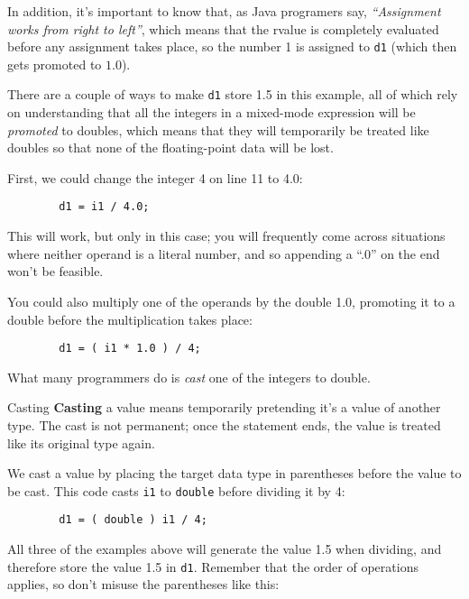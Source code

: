 In addition, it's important to know that, as Java programers say, \textit{``Assignment works from right to left''}, which means that the rvalue is completely evaluated before any assignment takes place, so the number 1 is assigned to \lstinline{d1} (which then gets promoted to $1.0$).

There are a couple of ways to make \texttt{d1} store 1.5 in this example, all of which rely on understanding that all the integers in a mixed-mode expression will be \textit{promoted} to doubles, which means that they will temporarily be treated like doubles so that none of the floating-point data will be lost.

First, we could change the integer 4 on line 11 to 4.0:

\begin{verbatim}
        d1 = i1 / 4.0;
\end{verbatim}

This will work, but only in this case; you will frequently come across situations where neither operand is a literal number, and so appending a ``.0'' on the end won't be feasible.

You could also multiply one of the operands by the double 1.0, promoting it to a double before the multiplication takes place:

\begin{verbatim}
        d1 = ( i1 * 1.0 ) / 4;
\end{verbatim}

What many programmers do is \textit{cast} one of the integers to double.

\begin{defn}{Casting}
\textbf{Casting} a value means temporarily pretending it's a value of another type.  The cast is not permanent; once the statement ends, the value is treated like its original type again.
\end{defn}

We cast a value by placing the target data type in parentheses before the value to be cast.  This code casts \lstinline{i1} to \lstinline{double} before dividing it by 4:

\begin{verbatim}
        d1 = ( double ) i1 / 4;
\end{verbatim}

All three of the examples above will generate the value 1.5 when dividing, and therefore store the value 1.5 in \lstinline{d1}.  Remember that the order of operations applies, so don't misuse the parentheses like this:


